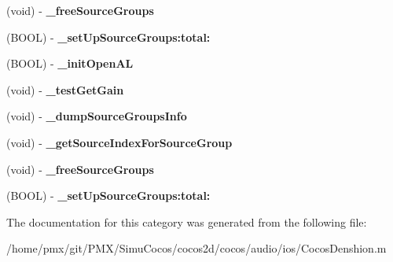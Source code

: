 \begin{DoxyCompactItemize}
\item 
\mbox{\label{categoryCDSoundEngine_07PrivateMethods_08_a1d1eb0f2b085ebb69b25239e453ec448}} 
(void) -\/ {\bfseries \+\_\+free\+Source\+Groups}
\item 
\mbox{\label{categoryCDSoundEngine_07PrivateMethods_08_a0cd2d907a4f4a71ba2bac55dea8a9ea3}} 
(B\+O\+OL) -\/ {\bfseries \+\_\+set\+Up\+Source\+Groups\+:total\+:}
\item 
\mbox{\label{categoryCDSoundEngine_07PrivateMethods_08_aefd4b4cb3b3a07068e2438b2b4f2a3c8}} 
(B\+O\+OL) -\/ {\bfseries \+\_\+init\+Open\+AL}
\item 
\mbox{\label{categoryCDSoundEngine_07PrivateMethods_08_a7363c48562f49a17d3d82079cd6bce4b}} 
(void) -\/ {\bfseries \+\_\+test\+Get\+Gain}
\item 
\mbox{\label{categoryCDSoundEngine_07PrivateMethods_08_a8a0e3e538ac804c39b0b9ac53e7fb13f}} 
(void) -\/ {\bfseries \+\_\+dump\+Source\+Groups\+Info}
\item 
\mbox{\label{categoryCDSoundEngine_07PrivateMethods_08_a65c2b77030a096474b6962bb9b3a8294}} 
(void) -\/ {\bfseries \+\_\+get\+Source\+Index\+For\+Source\+Group}
\item 
\mbox{\label{categoryCDSoundEngine_07PrivateMethods_08_a1d1eb0f2b085ebb69b25239e453ec448}} 
(void) -\/ {\bfseries \+\_\+free\+Source\+Groups}
\item 
\mbox{\label{categoryCDSoundEngine_07PrivateMethods_08_a0cd2d907a4f4a71ba2bac55dea8a9ea3}} 
(B\+O\+OL) -\/ {\bfseries \+\_\+set\+Up\+Source\+Groups\+:total\+:}
\end{DoxyCompactItemize}


The documentation for this category was generated from the following file\+:\begin{DoxyCompactItemize}
\item 
/home/pmx/git/\+P\+M\+X/\+Simu\+Cocos/cocos2d/cocos/audio/ios/Cocos\+Denshion.\+m\end{DoxyCompactItemize}
